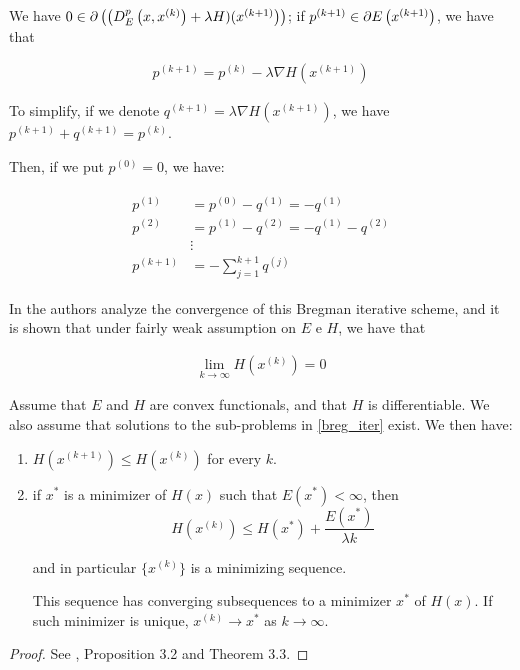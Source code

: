 We have $0 \in \partial\left(\left(D^p_E\left(x,x^{(k)}\right)+\lambda H)(x^{(k+1)}\right)\right)$; if $p^{(k+1)} \in \partial E\left(x^{(k+1)}\right)$, we have that

\begin{align}
 p^{(k+1)} = p^{(k)} - \lambda \nabla H \left(x^{(k+1)}\right)
 \end{align}

To simplify, if we denote $q^{(k+1)} = \lambda \nabla H\left(x^{(k+1)}\right)$, we have $p^{(k+1)} + q^{(k+1)} = p^{(k)}$.

Then, if we put $p^{(0)} = 0$, we have:

\begin{align} \label{pk}
\begin{aligned}
p^{(1)} &= p^{(0)} - q^{(1)} = -q^{(1)} \\
p^{(2)} &= p^{(1)} - q^{(2)} = -q^{(1)} -q^{(2)} \\
&\vdots \\
p^{(k+1)} &= - \sum_{j=1}^{k+1} q^{(j)}
\end{aligned}
\end{align}

In \citep{reg_tv} the authors analyze the convergence of this Bregman iterative scheme, and it is shown that under fairly weak assumption on $E$ e $H$, we have that

\begin{align} \label{breg_cvg}
\lim_{k \to \infty} H\left(x^{(k)}\right) = 0
\end{align}

\begin{theorem}
Assume that $E$ and $H$ are convex functionals, and that $H$ is differentiable. We also assume that solutions to the sub-problems in \eqref{breg_iter} exist. We then have:

\begin{enumerate}
\item $H\left(x^{(k+1)}\right) \leq H\left(x^{(k)}\right)$ for every $k$.
\item if $x^*$ is a minimizer of $H(x)$ such that $E(x^*)<\infty$, then
$$H\left(x^{(k)}\right) \leq H(x^*) + \dfrac{E(x^*)}{\lambda k}$$

and in particular $\{ x^{(k)} \}$ is a minimizing sequence.

This sequence has converging subsequences to a minimizer $x^*$ of $H(x)$. If such minimizer is unique, $x^{(k)} \to x^*$ as $k \to \infty$.
\end{enumerate}
 \end{theorem}
 \begin{proof}
 See \citep{reg_tv}, Proposition 3.2 and Theorem 3.3.
 \end{proof}

